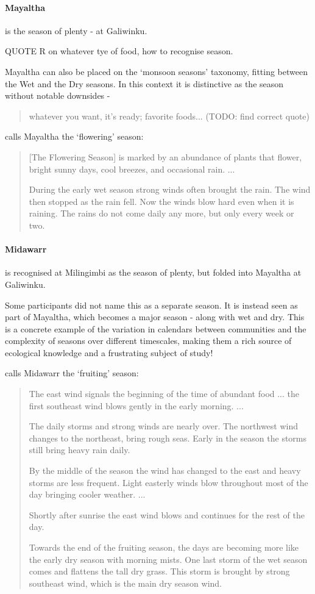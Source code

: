 \paragraph{Mayaltha} is the season of plenty - at Galiwinku.  

QUOTE R on whatever tye of food, how to recognise season.

Mayaltha can also be placed on the `monsoon seasons' taxonomy, fitting
between the Wet and the Dry seasons.  In this context it is distinctive
as the season without notable downsides - \blockquote{
    whatever you want, it's ready; favorite foods... (TODO: find correct quote)
}.

\citet{davis1989} calls Mayaltha the `flowering' season:
\blockquote{
    [The Flowering Season] is marked by an abundance of plants that flower,
    bright sunny days, cool breezes, and occasional rain. ...
    
    During the early wet season strong winds often brought the rain.
    The wind then stopped as the rain fell.
    Now the winds blow hard even when it is raining.
    The rains do not come daily any more, but only every week or two.
}


\paragraph{Midawarr} is recognised at Milingimbi as the season of plenty,
but folded into Mayaltha at Galiwinku.

Some participants did not name this as a separate season.
It is instead seen as part of Mayaltha, which becomes a major season - along with wet and dry.
This is a concrete example of the variation in calendars between
communities and the complexity of seasons over different timescales,
making them a rich source of ecological knowledge and a frustrating subject of study!

\citet{davis1989} calls Midawarr the `fruiting' season:
\blockquote{
    The east wind signals the beginning of the time of abundant food ...
    the first southeast wind blows gently in the early morning. ...
    
    The daily storms and strong winds are nearly over.
    The northwest wind changes to the northeast, bring rough seas.
    Early in the season the storms still bring heavy rain daily.
    
    By the middle of the season the wind has changed to the east and heavy storms are less frequent.
    Light easterly winds blow throughout most of the day bringing cooler weather. ...
    
    Shortly after sunrise the east wind blows and continues for the rest of the day.
    
    Towards the end of the fruiting season, the days are becoming
    more like the early dry season with morning mists.
    One last storm of the wet season comes and flattens the tall dry grass.
    This storm is brought by strong southeast wind, which is the main dry season wind.
}


